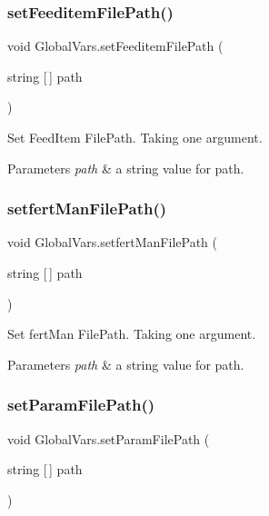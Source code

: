 \subsubsection{\texorpdfstring{setFeeditemFilePath()}{setFeeditemFilePath()}}
{\footnotesize\ttfamily void Global\+Vars.\+set\+Feeditem\+File\+Path (\begin{DoxyParamCaption}\item[{string \mbox{[}$\,$\mbox{]}}]{path }\end{DoxyParamCaption})\hspace{0.3cm}{\ttfamily [inline]}}



Set Feed\+Item File\+Path. Taking one argument. 


\begin{DoxyParams}{Parameters}
{\em path} & a string value for path. \\
\hline
\end{DoxyParams}
\mbox{\label{class_global_vars_aed3b5ff219e7de5d3b559f94b5c6a6a3}} 
\subsubsection{\texorpdfstring{setfertManFilePath()}{setfertManFilePath()}}
{\footnotesize\ttfamily void Global\+Vars.\+setfert\+Man\+File\+Path (\begin{DoxyParamCaption}\item[{string \mbox{[}$\,$\mbox{]}}]{path }\end{DoxyParamCaption})\hspace{0.3cm}{\ttfamily [inline]}}



Set fert\+Man File\+Path. Taking one argument. 


\begin{DoxyParams}{Parameters}
{\em path} & a string value for path. \\
\hline
\end{DoxyParams}
\mbox{\label{class_global_vars_a600488f35519b3e549b8160de9fff555}} 
\subsubsection{\texorpdfstring{setParamFilePath()}{setParamFilePath()}}
{\footnotesize\ttfamily void Global\+Vars.\+set\+Param\+File\+Path (\begin{DoxyParamCaption}\item[{string \mbox{[}$\,$\mbox{]}}]{path }\end{DoxyParamCaption})\hspace{0.3cm}{\ttfamily [inline]}}




